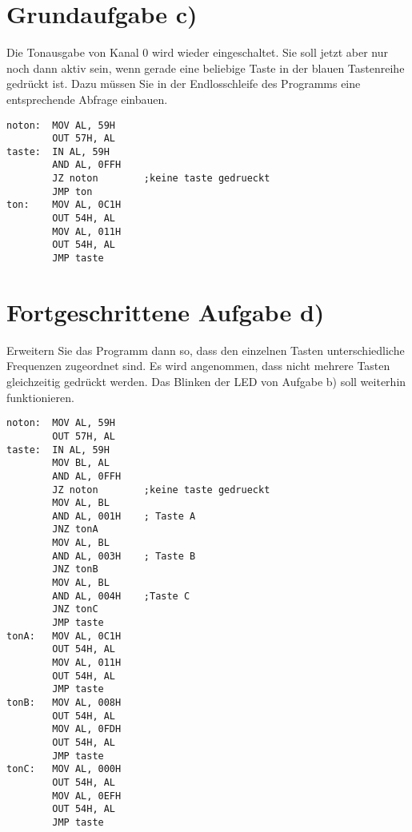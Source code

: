 \documentclass[10pt, a4paper]{report}
\begin{document}
\section*{ Grundaufgabe c)}
\scriptsize{Die Tonausgabe von Kanal 0 wird wieder eingeschaltet. Sie soll jetzt aber nur noch dann aktiv sein, wenn gerade eine beliebige Taste in der blauen Tastenreihe gedrückt ist. Dazu müssen Sie in der Endlosschleife des Programms eine entsprechende Abfrage einbauen.}

\begin{lstlisting}
noton:  MOV AL, 59H
        OUT 57H, AL
taste:  IN AL, 59H
        AND AL, 0FFH
        JZ noton        ;keine taste gedrueckt
        JMP ton
ton:    MOV AL, 0C1H
        OUT 54H, AL
        MOV AL, 011H
        OUT 54H, AL
        JMP taste
\end{lstlisting}

\section*{ Fortgeschrittene Aufgabe d)}
\scriptsize{Erweitern Sie das Programm dann so, dass den einzelnen Tasten unterschiedliche Frequenzen zugeordnet sind. Es wird angenommen, dass nicht mehrere Tasten gleichzeitig gedrückt werden. Das  Blinken  der  LED  von  Aufgabe  b)  soll  weiterhin  funktionieren. }

\begin{lstlisting}
noton:  MOV AL, 59H
        OUT 57H, AL
taste:  IN AL, 59H
        MOV BL, AL
        AND AL, 0FFH
        JZ noton        ;keine taste gedrueckt
        MOV AL, BL
        AND AL, 001H    ; Taste A
        JNZ tonA
        MOV AL, BL
        AND AL, 003H    ; Taste B
        JNZ tonB
        MOV AL, BL
        AND AL, 004H    ;Taste C
        JNZ tonC
        JMP taste
tonA:   MOV AL, 0C1H
        OUT 54H, AL
        MOV AL, 011H
        OUT 54H, AL
        JMP taste
tonB:   MOV AL, 008H
        OUT 54H, AL
        MOV AL, 0FDH
        OUT 54H, AL
        JMP taste
tonC:   MOV AL, 000H
        OUT 54H, AL
        MOV AL, 0EFH
        OUT 54H, AL
        JMP taste

\end{lstlisting}
\end{document}
